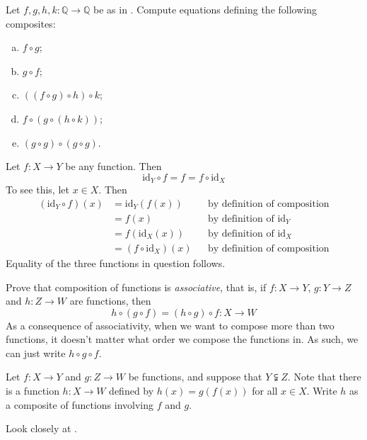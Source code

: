 \begin{exercise}
Let $f,g,h,k : \mathbb{Q} \to \mathbb{Q}$ be as in . Compute equations defining the following composites:
\begin{enumerate}[(a)]
\item $f \circ g$;
\item $g \circ f$;
\item $((f \circ g) \circ h) \circ k$;
\item $f \circ (g \circ (h \circ k))$;
\item $(g \circ g) \circ (g \circ g)$.
\end{enumerate}
\end{exercise}

\begin{example}
\label{exCompositionWithIdentityIsTrivial}
Let $f : X \to Y$ be any function. Then
\[ \mathrm{id}_Y \circ f = f = f \circ \mathrm{id}_X \]
To see this, let $x \in X$. Then
\begin{align*}
(\mathrm{id}_Y \circ f)(x) &= \mathrm{id}_Y(f(x)) && \text{by definition of composition} \\
&= f(x) && \text{by definition of $\mathrm{id}_Y$} \\
&= f(\mathrm{id}_X(x)) && \text{by definition of $\mathrm{id}_X$} \\
&= (f \circ \mathrm{id}_X)(x) && \text{by definition of composition}
\end{align*}
Equality of the three functions in question follows.
\end{example}

\begin{exercise}
\label{exCompositionIsAssociative}
Prove that composition of functions is \textit{associative}, that is, if $f : X \to Y$, $g : Y \to Z$ and $h : Z \to W$ are functions, then
\[ h \circ (g \circ f) = (h \circ g) \circ f : X \to W \]
As a consequence of associativity, when we want to compose more than two functions, it doesn't matter what order we compose the functions in. As such, we can just write $h \circ g \circ f$.
\end{exercise}

\begin{exercise}
\label{exCompositionWithoutMatchingCodomains}
Let $f : X \to Y$ and $g : Z \to W$ be functions, and suppose that $Y \subsetneqq Z$. Note that there is a function $h : X \to W$ defined by $h(x)=g(f(x))$ for all $x \in X$. Write $h$ as a composite of functions involving $f$ and $g$.
\begin{backhint}
Look closely at .
\end{backhint}
\end{exercise}

